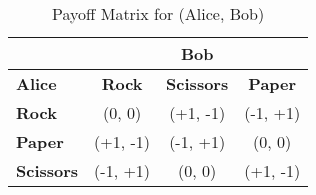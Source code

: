\documentclass[preview, border=2mm]{standalone}
\begin{document}
{\sffamily\everymath{\sf}

\vspace*{\fill}

\begin{table}[h]
\centering

\begin{tabular}{l|c|c|c}
\multicolumn{1}{c|}{} & \multicolumn{3}{c}{\textbf{Bob}} \\
\hline
\textbf{Alice} & \textbf{Rock} & \textbf{Scissors} & \textbf{Paper} \\
\hline
\textbf{Rock}     & (0, 0)     & (+1, -1)   & (-1, +1)   \\
\textbf{Paper}    & (+1, -1)   & (-1, +1)   & (0, 0)     \\
\textbf{Scissors} & (-1, +1)   & (0, 0)     & (+1, -1)   \\
\end{tabular}

\caption*{{\sffamily Payoff Matrix for (Alice, Bob)}}

\end{table}

\vspace*{\fill}

}
\end{document}
